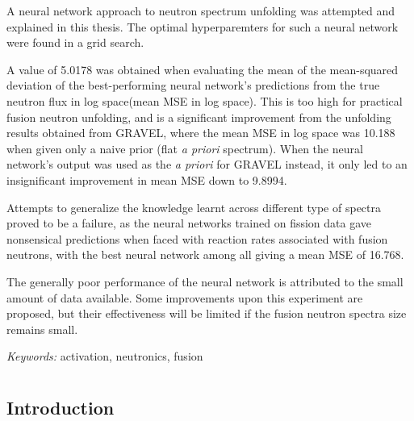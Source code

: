 \documentclass[a4paper, 12pt]{article}
\begin{document}
\abstract
    A neural network approach to neutron spectrum unfolding was attempted and explained in this thesis. The optimal hyperparemters for such a neural network were found in a grid search. 
	
	A value of 5.0178 was obtained when evaluating the mean of the mean-squared deviation of the best-performing neural network's predictions from the true neutron flux in log space(mean MSE in log space). This is too high for practical fusion neutron unfolding, and is a significant improvement from the unfolding results obtained from GRAVEL, where the mean MSE in log space was 10.188 when given only a naive prior (flat \emph{a priori} spectrum). When the neural network's output was used as the \emph{a priori} for GRAVEL instead, it only led to an insignificant improvement in mean MSE down to 9.8994.
	
	Attempts to generalize the knowledge learnt across different type of spectra proved to be a failure, as the neural networks trained on fission data gave nonsensical predictions when faced with reaction rates associated with fusion neutrons, with the best neural network among all giving a mean MSE of 16.768.
    
	The generally poor performance of the neural network is attributed to the small amount of data available. Some improvements upon this experiment are proposed, but their effectiveness will be limited if the fusion neutron spectra size remains small.

\emph{Keywords:} activation, neutronics, fusion
\pagebreak
\tableofcontents
\listoffigures
\pagebreak


\chapter{}
\section{Introduction}
    
\end{document}
